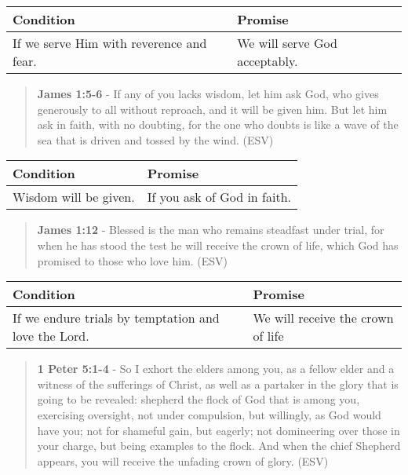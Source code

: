 \documentclass[11pt]{article}
\begin{document}
\begin{center}
\begin{tabular}{ll}
Condition & Promise\\[0pt]
\hline
If we serve Him with reverence and fear. & We will serve God acceptably.\\[0pt]
\end{tabular}
\end{center}

\begin{quote}
\textbf{James 1:5-6} - If any of you lacks wisdom, let him ask God, who gives generously to all without reproach, and it will be given him. But let him ask in faith, with no doubting, for the one who doubts is like a wave of the sea that is driven and tossed by the wind. (ESV)
\end{quote}

\begin{center}
\begin{tabular}{ll}
Condition & Promise\\[0pt]
\hline
Wisdom will be given. & If you ask of God in faith.\\[0pt]
\end{tabular}
\end{center}

\begin{quote}
\textbf{James 1:12} - Blessed is the man who remains steadfast under trial, for when he has stood the test he will receive the crown of life, which God has promised to those who love him. (ESV)
\end{quote}

\begin{center}
\begin{tabular}{ll}
Condition & Promise\\[0pt]
\hline
If we endure trials by temptation and love the Lord. & We will receive the crown of life\\[0pt]
\end{tabular}
\end{center}

\begin{quote}
\textbf{1 Peter 5:1-4} - So I exhort the elders among you, as a fellow elder and a witness of the sufferings of Christ, as well as a partaker in the glory that is going to be revealed: shepherd the flock of God that is among you, exercising oversight, not under compulsion, but willingly, as God would have you; not for shameful gain, but eagerly; not domineering over those in your charge, but being examples to the flock. And when the chief Shepherd appears, you will receive the unfading crown of glory. (ESV)
\end{quote}
\end{document}

